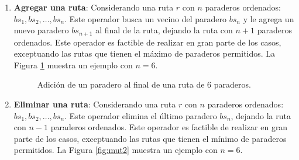 \begin{enumerate}
\item \textbf{Agregar una ruta}: Considerando una ruta $r$ con $n$ paraderos ordenados: $bs_1, bs_2, \ldots, bs_n$. Este operador busca un vecino del paradero $bs_n$ y le agrega un nuevo paradero $bs_{n+1}$ al final de la ruta, dejando la ruta con $n+1$ paraderos ordenados. Este operador es factible de realizar en gran parte de los casos, exceptuando las rutas que tienen el máximo de paraderos permitidos. La Figura \ref{fig:mut1} muestra un ejemplo con $n=6$.

\begin{figure}[!htb]
\begin{center}
\end{center}
\caption{Adición de un paradero al final de una ruta de 6 paraderos.}
\label{fig:mut1}
\end{figure}

\item \textbf{Eliminar una ruta}: Considerando una ruta $r$ con $n$ paraderos ordenados: $bs_1, bs_2, \ldots, bs_n$. Este operador elimina el último paradero $bs_n$, dejando la ruta con $n-1$ paraderos ordenados. Este operador es factible de realizar en gran parte de los casos, exceptuando las rutas que tienen el mínimo de paraderos permitidos. La Figura \ref{fig:mut2} muestra un ejemplo con $n=6$.

\begin{figure}[!htb]
\begin{center}
\end{center}
\end{figure}
\end{enumerate}
